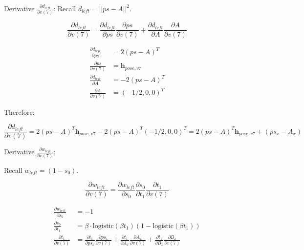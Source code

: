 \documentclass[11pt]{article}
\begin{document}
                Derivative $\frac{\partial d_{left}}{\partial v(7)}$:
                Recall $d_{left} = ||ps - A||^2$.

                \begin{equation}
                    \frac{\partial d_{left}}{\partial v(7)} = \frac{\partial d_{left}}{\partial ps} \frac{\partial ps}{\partial v(7)} + \frac{\partial d_{left}}{\partial A} \frac{\partial A}{\partial v(7)}
                \end{equation}

                \begin{align}
                    \frac{\partial d_{left}}{\partial ps} &= 2(ps - A)^T \\
                    \frac{\partial ps}{\partial v(7)} &= \mathbf{h}_{pose,v7} \\
                    \frac{\partial d_{left}}{\partial A} &= -2(ps - A)^T \\
                    \frac{\partial A}{\partial v(7)} &= (-1/2, 0, 0)^T
                \end{align}

                Therefore:

                \begin{equation}
                    \frac{\partial d_{left}}{\partial v(7)} = 2(ps - A)^T \mathbf{h}_{pose,v7}  -2(ps - A)^T (-1/2, 0, 0)^T  = 2 (ps - A)^T \mathbf{h}_{pose,v7}  + (ps_x - A_x)
                \end{equation}

                Derivative $\frac{\partial w_{left}}{\partial v(7)}$:

                Recall $w_{left} = (1 - s_0)$.

                \begin{equation}
                    \frac{\partial w_{left}}{\partial v(7)} = \frac{\partial w_{left}}{\partial s_0} \frac{\partial s_0}{\partial t_1} \frac{\partial t_1}{\partial v(7)}
                \end{equation}

                \begin{align}
                    \frac{\partial w_{left}}{\partial s_0} &= -1 \\
                    \frac{\partial s_0}{\partial t_1} &= \beta \cdot \text{logistic}(\beta t_1) (1 - \text{logistic}(\beta t_1))\\
                    \frac{\partial t_1}{\partial v(7)} &=  \frac{\partial t_1}{\partial ps_{x}} \frac{\partial ps_{x}}{\partial v(7)} + \frac{\partial t_1}{\partial A_{x}} \frac{\partial A_{x}}{\partial v(7)} +  \frac{\partial t_1}{\partial B_{x}} \frac{\partial B_{ x}}{\partial v(7)}
                \end{align}
\end{document}

